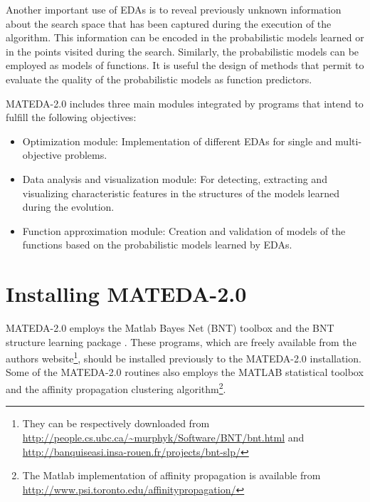 \documentclass[a4paper]{article}
\begin{document}
    Another important use of EDAs is to reveal previously unknown
   information about the search space that has been captured during
   the execution of the algorithm. This information can be encoded
   in the probabilistic models learned or in the points visited
   during the search. Similarly, the probabilistic models can be employed as models of
   functions.  It is useful the design of methods that permit to evaluate the quality
   of the probabilistic models as function predictors.


  MATEDA-2.0  includes three main modules integrated by programs that intend
to fulfill the following objectives:


\begin{itemize}
  \item Optimization module: Implementation of different EDAs for
  single and multi-objective problems.

  \item Data analysis and visualization module: For detecting, extracting and
  visualizing characteristic features in the structures of the models learned during the
  evolution.

 \item Function approximation module: Creation and validation of models of the functions
  based on  the probabilistic models learned by EDAs.

\end{itemize}




\section{Installing MATEDA-2.0}

  MATEDA-2.0 employs the Matlab Bayes Net (BNT) toolbox
\cite{Murphy:2001} and the BNT structure learning package
\cite{Leray_and_Francois:2004}. These programs, which are freely
available from the authors website\footnote{They can be respectively
downloaded from \url{http://people.cs.ubc.ca/~murphyk/Software/BNT/bnt.html}
 and \url{http://banquiseasi.insa-rouen.fr/projects/bnt-slp/}},
should be installed previously to the MATEDA-2.0 installation. Some
of the MATEDA-2.0 routines also employs the MATLAB statistical
toolbox and the affinity propagation  clustering
algorithm\cite{Frey_and_Dueck:2007}\footnote{The Matlab
implementation of affinity
  propagation is available from \url{http://www.psi.toronto.edu/affinitypropagation/}}.
\end{document}

